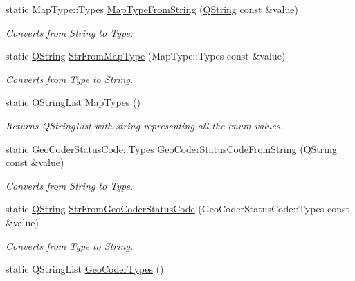 \begin{DoxyCompactItemize}
\item 
static \-Map\-Type\-::\-Types \hyperlink{group___o_p_map_widget_gae829b229cde8f7beebc9f3c0981f674c}{\-Map\-Type\-From\-String} (\hyperlink{group___u_a_v_objects_plugin_gab9d252f49c333c94a72f97ce3105a32d}{\-Q\-String} const \&value)
\begin{DoxyCompactList}\small\item\em \-Converts from \-String to \-Type. \end{DoxyCompactList}\item 
static \hyperlink{group___u_a_v_objects_plugin_gab9d252f49c333c94a72f97ce3105a32d}{\-Q\-String} \hyperlink{group___o_p_map_widget_ga25fd053ddcb478b681163806de9514b7}{\-Str\-From\-Map\-Type} (\-Map\-Type\-::\-Types const \&value)
\begin{DoxyCompactList}\small\item\em \-Converts from \-Type to \-String. \end{DoxyCompactList}\item 
static \-Q\-String\-List \hyperlink{group___o_p_map_widget_gad4c683c34a93de153146c87382c53719}{\-Map\-Types} ()
\begin{DoxyCompactList}\small\item\em \-Returns \-Q\-String\-List with string representing all the enum values. \end{DoxyCompactList}\item 
static \-Geo\-Coder\-Status\-Code\-::\-Types \hyperlink{group___o_p_map_widget_gad60261d49176a6eea081705bcd37c2b7}{\-Geo\-Coder\-Status\-Code\-From\-String} (\hyperlink{group___u_a_v_objects_plugin_gab9d252f49c333c94a72f97ce3105a32d}{\-Q\-String} const \&value)
\begin{DoxyCompactList}\small\item\em \-Converts from \-String to \-Type. \end{DoxyCompactList}\item 
static \hyperlink{group___u_a_v_objects_plugin_gab9d252f49c333c94a72f97ce3105a32d}{\-Q\-String} \hyperlink{group___o_p_map_widget_ga8641f35e4dcfdeb18e53899718555abb}{\-Str\-From\-Geo\-Coder\-Status\-Code} (\-Geo\-Coder\-Status\-Code\-::\-Types const \&value)
\begin{DoxyCompactList}\small\item\em \-Converts from \-Type to \-String. \end{DoxyCompactList}\item 
static \-Q\-String\-List \hyperlink{group___o_p_map_widget_ga461898c6bdb8fe425dc78ff470a9867a}{\-Geo\-Coder\-Types} ()

\end{DoxyCompactItemize}
